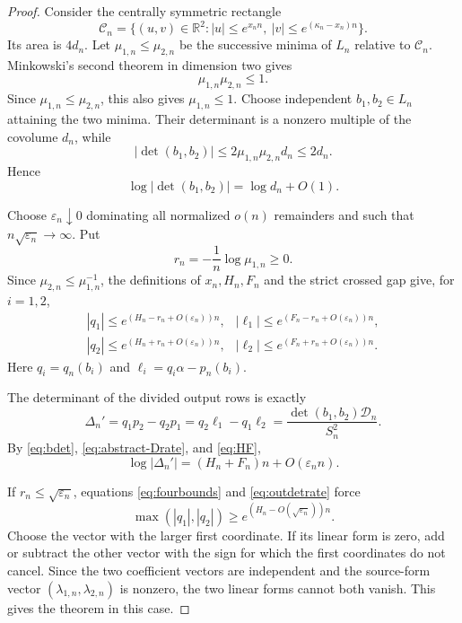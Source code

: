 \documentclass[11pt]{article}
\theoremstyle{definition}
\theoremstyle{remark}
\newcommand{\R}{\mathbb R}
\begin{document}
\begin{proof}
Consider the centrally symmetric rectangle
\[
\mathcal C_n=\{(u,v)\in\R^2:|u|\le e^{x_nn},\ |v|\le e^{(\kappa_n-x_n)n}\}.
\]
Its area is $4d_n$.  Let $\mu_{1,n}\le\mu_{2,n}$ be the successive minima of $L_n$ relative to $\mathcal C_n$.  Minkowski's second theorem in dimension two gives
\[
\mu_{1,n}\mu_{2,n}\le1.
\]
Since $\mu_{1,n}\le\mu_{2,n}$, this also gives $\mu_{1,n}\le1$.
Choose independent $b_1,b_2\in L_n$ attaining the two minima.  Their determinant is a nonzero multiple of the covolume $d_n$, while
\[
|\det(b_1,b_2)|\le2\mu_{1,n}\mu_{2,n}d_n\le2d_n.
\]
Hence
\begin{equation}\label{eq:bdet}
\log|\det(b_1,b_2)|=\log d_n+O(1).
\end{equation}

Choose $\varepsilon_n\downarrow0$ dominating all normalized $o(n)$ remainders and such that $n\sqrt{\varepsilon_n}\to\infty$.  Put
\[
r_n=-\frac1n\log\mu_{1,n}\ge0.
\]
Since $\mu_{2,n}\le\mu_{1,n}^{-1}$, the definitions of $x_n,H_n,F_n$ and the strict crossed gap give, for $i=1,2$,
\begin{equation}\label{eq:fourbounds}
\begin{array}{ll}
|q_1|\le e^{(H_n-r_n+O(\varepsilon_n))n},&
|\ell_1|\le e^{(F_n-r_n+O(\varepsilon_n))n},\\
|q_2|\le e^{(H_n+r_n+O(\varepsilon_n))n},&
|\ell_2|\le e^{(F_n+r_n+O(\varepsilon_n))n}.
\end{array}
\end{equation}
Here $q_i=q_n(b_i)$ and $\ell_i=q_i\alpha-p_n(b_i)$.

The determinant of the divided output rows is exactly
\begin{equation}\label{eq:outdet}
\Delta_n'=q_1p_2-q_2p_1=q_2\ell_1-q_1\ell_2
=\frac{\det(b_1,b_2)\mathcal D_n}{S_n^2}.
\end{equation}
By \eqref{eq:bdet}, \eqref{eq:abstract-Drate}, and \eqref{eq:HF},
\begin{equation}\label{eq:outdetrate}
\log|\Delta_n'|=(H_n+F_n)n+O(\varepsilon_nn).
\end{equation}

If $r_n\le\sqrt{\varepsilon_n}$, equations \eqref{eq:fourbounds} and \eqref{eq:outdetrate} force
\[
\max(|q_1|,|q_2|)\ge e^{(H_n-O(\sqrt{\varepsilon_n}))n}.
\]
Choose the vector with the larger first coordinate.  If its linear form is zero, add or subtract the other vector with the sign for which the first coordinates do not cancel.  Since the two coefficient vectors are independent and the source-form vector $(\lambda_{1,n},\lambda_{2,n})$ is nonzero, the two linear forms cannot both vanish.  This gives the theorem in this case.


\end{proof}
\end{document}
